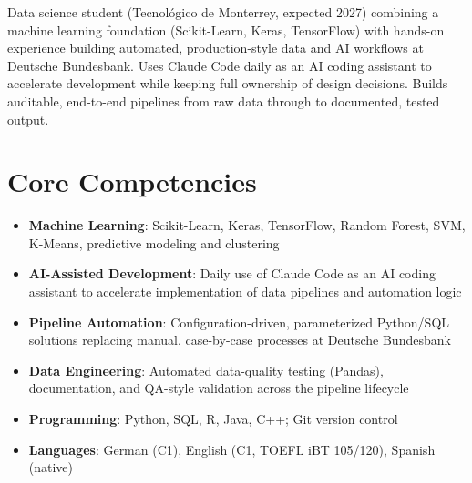 \documentclass[11pt,a4paper,sans]{moderncv}
\begin{document}
\makecvtitle


\vspace{6pt}
\small{Data science student (Tecnológico de Monterrey, expected 2027) combining a machine learning foundation (Scikit-Learn, Keras, TensorFlow) with hands-on experience building automated, production-style data and AI workflows at Deutsche Bundesbank. Uses Claude Code daily as an AI coding assistant to accelerate development while keeping full ownership of design decisions. Builds auditable, end-to-end pipelines from raw data through to documented, tested output.}


\section{Core Competencies}
\vspace{1pt}
\begin{itemize}

\item \textbf{Machine Learning}: Scikit-Learn, Keras, TensorFlow, Random Forest, SVM, K-Means, predictive modeling and clustering

\item \textbf{AI-Assisted Development}: Daily use of Claude Code as an AI coding assistant to accelerate implementation of data pipelines and automation logic

\item \textbf{Pipeline Automation}: Configuration-driven, parameterized Python/SQL solutions replacing manual, case-by-case processes at Deutsche Bundesbank

\item \textbf{Data Engineering}: Automated data-quality testing (Pandas), documentation, and QA-style validation across the pipeline lifecycle

\item \textbf{Programming}: Python, SQL, R, Java, C++; Git version control

\item \textbf{Languages}: German (C1), English (C1, TOEFL iBT 105/120), Spanish (native)

\end{itemize}
\end{document}
